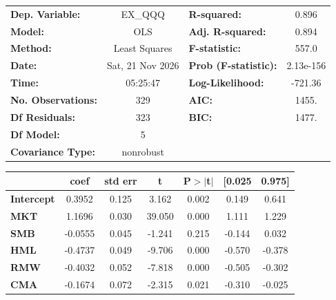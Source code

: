 \begin{center}
\begin{tabular}{lclc}
\toprule
\textbf{Dep. Variable:}    &     EX\_QQQ      & \textbf{  R-squared:         } &     0.896   \\
\textbf{Model:}            &       OLS        & \textbf{  Adj. R-squared:    } &     0.894   \\
\textbf{Method:}           &  Least Squares   & \textbf{  F-statistic:       } &     557.0   \\
\textbf{Date:}             & Sat, 21 Nov 2026 & \textbf{  Prob (F-statistic):} & 2.13e-156   \\
\textbf{Time:}             &     05:25:47     & \textbf{  Log-Likelihood:    } &   -721.36   \\
\textbf{No. Observations:} &         329      & \textbf{  AIC:               } &     1455.   \\
\textbf{Df Residuals:}     &         323      & \textbf{  BIC:               } &     1477.   \\
\textbf{Df Model:}         &           5      & \textbf{                     } &             \\
\textbf{Covariance Type:}  &    nonrobust     & \textbf{                     } &             \\
\bottomrule
\end{tabular}
\begin{tabular}{lcccccc}
                   & \textbf{coef} & \textbf{std err} & \textbf{t} & \textbf{P$> |$t$|$} & \textbf{[0.025} & \textbf{0.975]}  \\
\midrule
\textbf{Intercept} &       0.3952  &        0.125     &     3.162  &         0.002        &        0.149    &        0.641     \\
\textbf{MKT}       &       1.1696  &        0.030     &    39.050  &         0.000        &        1.111    &        1.229     \\
\textbf{SMB}       &      -0.0555  &        0.045     &    -1.241  &         0.215        &       -0.144    &        0.032     \\
\textbf{HML}       &      -0.4737  &        0.049     &    -9.706  &         0.000        &       -0.570    &       -0.378     \\
\textbf{RMW}       &      -0.4032  &        0.052     &    -7.818  &         0.000        &       -0.505    &       -0.302     \\
\textbf{CMA}       &      -0.1674  &        0.072     &    -2.315  &         0.021        &       -0.310    &       -0.025     \\

\end{tabular}
\end{center}
